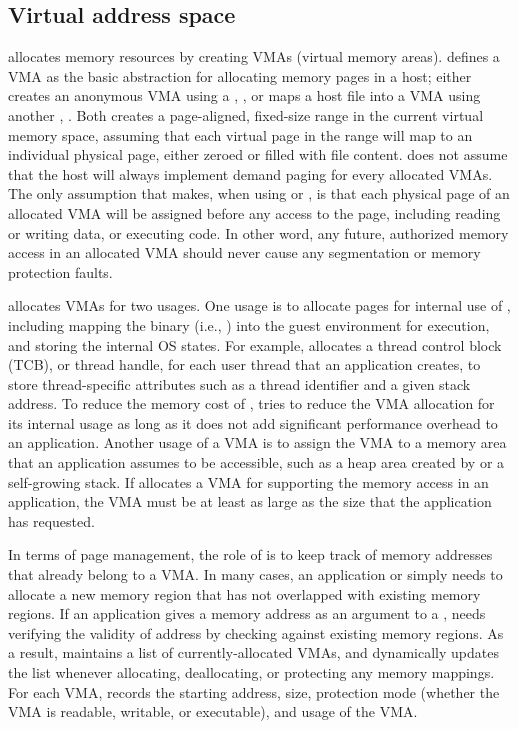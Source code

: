 \subsection{Virtual address space}
\label{sec:libos:vma}


\thelibos{} allocates memory resources by creating VMAs (virtual memory areas).
\Thehostabi{} defines a VMA
as the basic abstraction for allocating memory pages
in a host;
\thelibos{} either creates an anonymous VMA using a \hostapi{}, ,
or maps a host file into a VMA using another \hostapi{}, .
Both \hostapis{} creates a page-aligned, fixed-size range in the
current virtual memory space,
assuming that each virtual page in the range
will map to an individual physical page, either zeroed or filled with file content.
\thelibos{} does not assume
that the host will always implement demand paging
for every allocated VMAs.
The only assumption that \thelibos{} makes, when using  or ,
is that each physical page of an allocated VMA
will be assigned
before any access to the page, including reading or writing data,
or executing code.
In other word, any future, authorized memory access
in an allocated VMA
should never cause any segmentation or memory protection faults.



\thelibos{} allocates VMAs for two usages.
One usage is to allocate pages for internal use of \thelibos{},
including mapping the \thelibos{} binary
(i.e., \thelibos{})
into the guest environment for execution,
and storing the internal OS states.
For example, \thelibos{} allocates a thread control block (TCB), or thread handle, for each user thread that an application creates, to store thread-specific attributes
such as a thread identifier and a given stack address.
To reduce the memory cost of \graphene{},
\thelibos{} tries to reduce the VMA allocation for its internal usage
as long as it does not add significant performance overhead to an application.
Another usage of a VMA
is to assign the VMA to a memory area that an application
assumes to be accessible, such as a heap area created by  or a self-growing stack.
If \thelibos{} allocates a VMA for supporting the memory access in an application,
the VMA must be at least as large as the size that the application has requested.



In terms of page management,
the role of \thelibos{} is to keep track of memory addresses that already belong to a VMA.
In many cases,
an application or \thelibos{}
simply needs to allocate a new memory region that has not overlapped
with existing memory regions.
If an application gives a memory address
as an argument to a \linuxapi{},
\thelibos{} needs verifying the validity of address by checking against existing memory regions. 
As a result,
\thelibos{} maintains a list of currently-allocated VMAs,
and dynamically updates the list whenever allocating, deallocating, or protecting any memory mappings.
For each VMA, \thelibos{} records
the starting address, size, protection mode (whether the VMA is readable, writable, or executable), and usage of the VMA.




